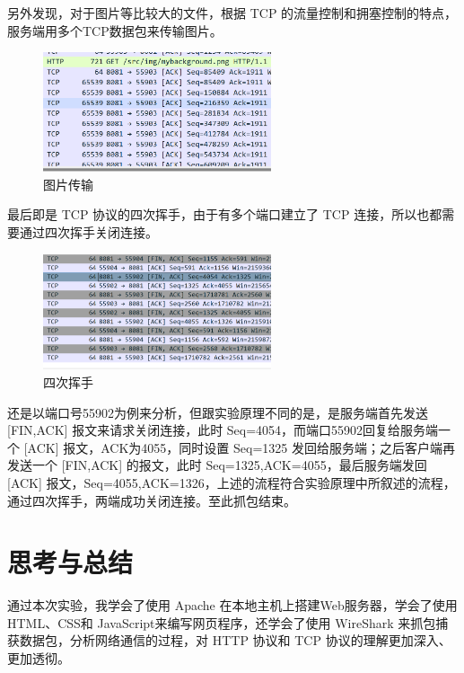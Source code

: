 \documentclass[UTF8,a4paper,10pt]{ctexart}
\begin{document}
另外发现，对于图片等比较大的文件，根据 TCP 的流量控制和拥塞控制的特点，服务端用多个TCP数据包来传输图片。
\begin{figure}[H]
    \centering
\includegraphics[width=0.6\textwidth]{img/图片传输.png}
    \caption{图片传输}
\end{figure}
最后即是 TCP 协议的四次挥手，由于有多个端口建立了 TCP 连接，所以也都需要通过四次挥手关闭连接。
\begin{figure}[H]
    \centering
\includegraphics[width=0.6\textwidth]{img/四次挥手.png}
    \caption{四次挥手}
\end{figure}
还是以端口号55902为例来分析，但跟实验原理不同的是，是服务端首先发送 [FIN,ACK] 报文来请求关闭连接，此时 Seq=4054，而端口55902回复给服务端一个 [ACK] 报文，ACK为4055，同时设置 Seq=1325 发回给服务端；之后客户端再发送一个 [FIN,ACK] 的报文，此时 Seq=1325,ACK=4055，最后服务端发回 [ACK] 报文，Seq=4055,ACK=1326，上述的流程符合实验原理中所叙述的流程，通过四次挥手，两端成功关闭连接。至此抓包结束。

\vspace{1cm}
\section{思考与总结}
通过本次实验，我学会了使用 Apache 在本地主机上搭建Web服务器，学会了使用 HTML、CSS和 JavaScript来编写网页程序，还学会了使用 WireShark 来抓包捕获数据包，分析网络通信的过程，对 HTTP 协议和 TCP 协议的理解更加深入、更加透彻。
\end{document}
